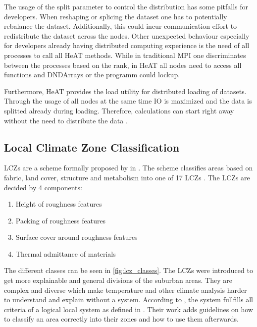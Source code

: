 The usage of the split parameter to control the distribution has some pitfalls for developers.
When reshaping or splicing the dataset one has to potentially rebalance the dataset. Additionally, this could incur communication effort
to redistribute the dataset across the nodes.
Other unexpected behaviour especially for developers already having distributed computing experience is the need of all processes to call all \gls{HeAT} methods.
While in traditional \gls{MPI} one discriminates between the processes based on the rank, in \gls{HeAT} all nodes need to access all functions and DNDArrays or the
programm could lockup.

Furthermore, \gls{HeAT} provides the load utility for distributed loading of datasets. Through the usage of all nodes at the same time \gls{IO} is maximized and the data
is splitted already during loading. Therefore, calculations can start right away without the need to distribute the data
\cite{krajsek_helmholtz_nodate}.


\subsection{Local Climate Zone Classification}
\label{subsec:local_climate_zone_classification}

\glspl{LCZ} are a scheme formally proposed by \citeauthor{stewart_local_2012} in \cite{stewart_local_2012}. The scheme classifies areas based on fabric, land cover, structure
and metabolism into one of 17 \gls{LCZ}s \cite{xue_applications_2020}.
The \gls{LCZ}s are decided by 4 components:
\begin{enumerate}
  \item Height of roughness features
  \item Packing of roughness features
  \item Surface cover around roughness features
  \item Thermal admittance of materials
\end{enumerate}
The different classes can be seen in \cref{fig:lcz_classes}.
The \glspl{LCZ} were introduced to get more explainable and general divisions of the suburban areas. They are complex and diverse which make temperature and other climate analysis harder
to understand and explain without a system. According to \citeauthor{stewart_local_2012}, the system fullfills all criteria of a logical local system as defined in \cite{grigg_logic_1965}.
Their work adds guidelines on how to classify an area correctly into their zones and how to use them afterwards.


